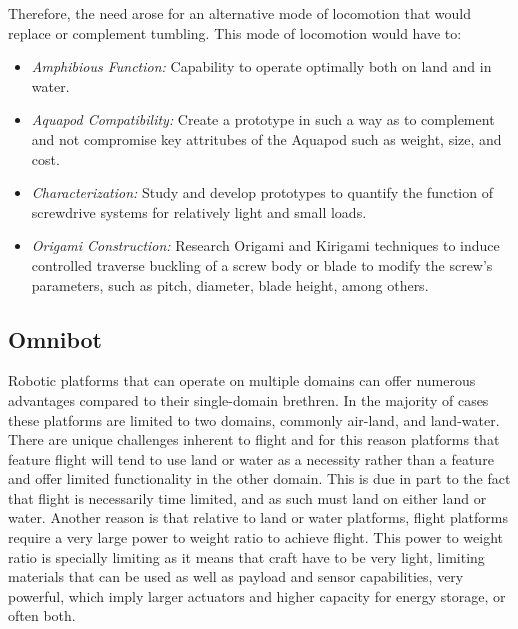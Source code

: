 Therefore, the need arose for an alternative mode of locomotion that would replace or complement tumbling. This mode of locomotion would have to:

\begin{itemize}
	\item \emph{Amphibious Function:} Capability to operate optimally both on land and in water. 
	\item \emph{Aquapod Compatibility:} Create a prototype in such a way as to complement and not compromise key attritubes of the Aquapod such as weight, size, and cost. 
	\item \emph{Characterization:} Study and develop prototypes to quantify the function of screwdrive systems for relatively light and small loads. 
	\item \emph{Origami Construction:} Research Origami and Kirigami techniques to induce controlled traverse buckling of a screw body or blade to modify the screw's parameters, such as pitch, diameter, blade height, among others. 
\end{itemize}
	

\subsection{Omnibot}

Robotic platforms that can operate on multiple domains can offer numerous advantages compared to their single-domain brethren. In the majority of cases these platforms are limited to two domains, commonly air-land, and land-water. There are unique challenges inherent to flight and for this reason platforms that feature flight will tend to use land or water as a necessity rather than a feature and offer limited functionality in the other domain. This is due in part to the fact that flight is necessarily time limited, and as such must land on either land or water. Another reason is that relative to land or water platforms, flight platforms require a very large power to weight ratio to achieve flight. This power to weight ratio is specially limiting as it means that craft have to be very light, limiting materials that can be used as well as payload and sensor capabilities, very powerful, which imply larger actuators and higher capacity for energy storage, or often both. 


